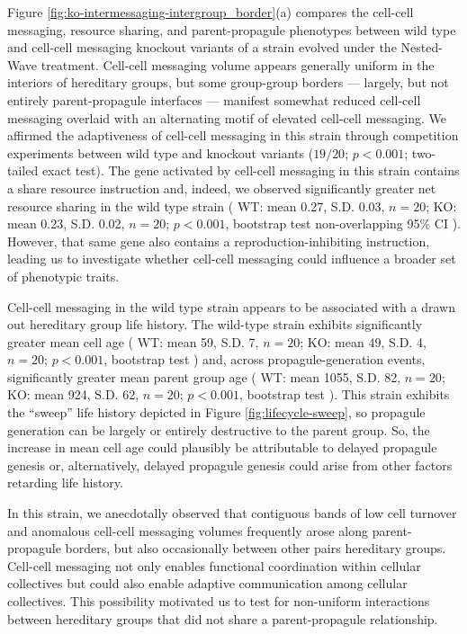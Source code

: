 Figure \ref{fig:ko-intermessaging-intergroup_border}(a) compares the cell-cell messaging, resource sharing, and parent-propagule phenotypes between wild type and cell-cell messaging knockout variants of a strain evolved under the Nested-Wave treatment.
Cell-cell messaging volume appears generally uniform in the interiors of hereditary groups, but some group-group borders --- largely, but not entirely parent-propagule interfaces --- manifest somewhat reduced cell-cell messaging overlaid with an alternating motif of elevated cell-cell messaging.
We affirmed the adaptiveness of cell-cell messaging in this strain through competition experiments between wild type and knockout variants ($19/20$; $p < 0.001$; two-tailed exact test).
The gene activated by cell-cell messaging in this strain contains a share resource instruction and, indeed, we observed significantly greater net resource sharing in the wild type strain
(%
WT: mean 0.27, S.D. 0.03, $n=20$;
KO: mean 0.23, S.D. 0.02, $n=20$;
$p < 0.001$, bootstrap test
non-overlapping 95\% CI%
). %
However, that same gene also contains a reproduction-inhibiting instruction, leading us to investigate whether cell-cell messaging could influence a broader set of phenotypic traits.

Cell-cell messaging in the wild type strain appears to be associated with a drawn out hereditary group life history.
The wild-type strain exhibits significantly greater mean cell age
(%
WT: mean 59, S.D. 7, $n=20$;
KO: mean 49, S.D. 4, $n=20$;
$p < 0.001$, bootstrap test%
) %
and, across propagule-generation events, significantly greater mean parent group age
(%
WT: mean 1055, S.D. 82, $n=20$;
KO: mean 924, S.D. 62, $n=20$;
$p < 0.001$, bootstrap test%
). %
This strain exhibits the ``sweep'' life history depicted in Figure \ref{fig:lifecycle-sweep}, so propagule generation can be largely or entirely destructive to the parent group.
So, the increase in mean cell age could plausibly be attributable to delayed propagule genesis or, alternatively, delayed propagule genesis could arise from other factors retarding life history.

In this strain, we anecdotally observed that contiguous bands of low cell turnover and anomalous cell-cell messaging volumes frequently arose along parent-propagule borders, but also occasionally between other pairs hereditary groups.
Cell-cell messaging not only enables functional coordination within cellular collectives but could also enable adaptive communication among cellular collectives.
This possibility motivated us to test for non-uniform interactions between hereditary groups that did not share a parent-propagule relationship.

